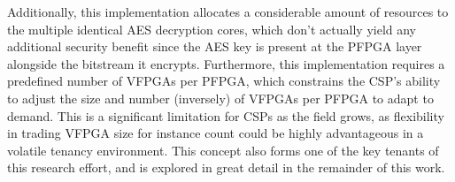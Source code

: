 Additionally, this implementation allocates a considerable amount of resources to the multiple identical AES decryption cores, which don't actually yield any additional security benefit since the AES key is present at the PFPGA layer alongside the bitstream it encrypts. Furthermore, this implementation requires a predefined number of VFPGAs per PFPGA, which constrains the CSP's ability to adjust the size and number (inversely) of VFPGAs per PFPGA to adapt to demand. This is a significant limitation for CSPs as the field grows, as flexibility in trading VFPGA size for instance count could be highly advantageous in a volatile tenancy environment. This concept also forms one of the key tenants of this research effort, and is explored in great detail in the remainder of this work.